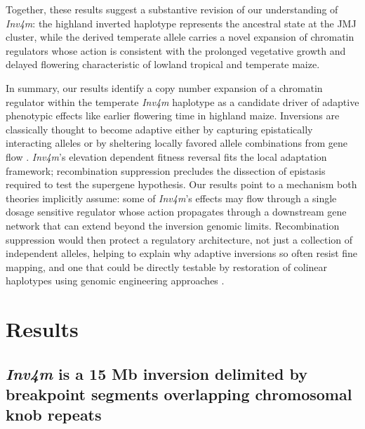 \documentclass[9pt,twocolumn,twoside]{rilabRxiv}
\newcommand{\invfour}{\textit{Inv4m}\xspace}
\begin{document}
Together, these results suggest a substantive revision of our understanding of \invfour: the highland inverted haplotype represents the ancestral state at the JMJ cluster, while the derived temperate allele carries a novel expansion of chromatin regulators whose action is consistent with the prolonged vegetative growth and delayed flowering characteristic of lowland tropical and temperate maize.


In summary, our results identify a copy number expansion of a chromatin regulator within the temperate \invfour haplotype as a candidate driver of adaptive phenotypic effects like earlier flowering time in highland maize.
Inversions are classically thought to become adaptive either by capturing epistatically interacting alleles \citep{dobzhansky1971genetics} or by sheltering locally favored allele combinations from gene flow \citep{kirkpatrick2006, kirkpatrick2010}.
\invfour's elevation dependent fitness reversal \citep{crow2020} fits the local adaptation framework; recombination suppression precludes the dissection of epistasis required to test the supergene hypothesis. 
Our results point to a mechanism both theories implicitly assume: some of \invfour's effects may flow through a single dosage sensitive regulator whose action propagates through a downstream gene network that can extend beyond the inversion genomic limits.
Recombination suppression would then protect a regulatory architecture, not just a collection of independent alleles, helping to explain why adaptive inversions so often resist fine mapping, and one that could be directly testable by restoration of colinear haplotypes using genomic engineering approaches \citep{Schwartz2020-el}.

\section{Results}

\subsection{\invfour is a 15 Mb inversion delimited by breakpoint segments overlapping chromosomal knob repeats}
\end{document}

